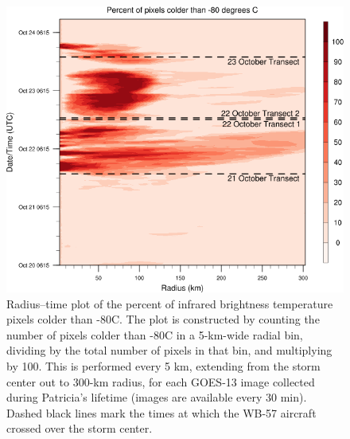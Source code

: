 \begin{figure}[ht]
\centerline{\includegraphics[width=39pc]{figures/fig08_hovmoller_tbpercent.png}}
\caption{Radius–time plot of the percent of infrared brightness temperature pixels colder than -80\textdegree{}C. The plot is constructed by counting the number of pixels colder than -80\textdegree{}C in a 5-km-wide radial bin, dividing by the total number of pixels in that bin, and multiplying by 100. This is performed every 5 km, extending from the storm center out to 300-km radius, for each GOES-13 image collected during Patricia’s lifetime (images are available every 30 min). Dashed black lines mark the times at which the WB-57 aircraft crossed over the storm center.}
\label{fig:hovmoller}
\end{figure}

